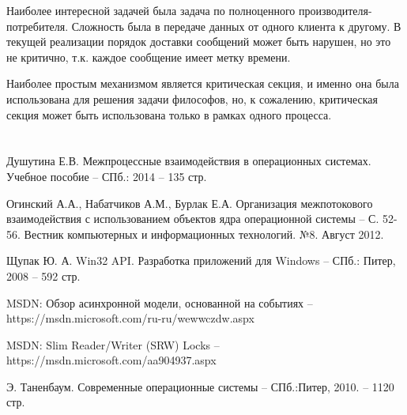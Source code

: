 \documentclass[a4paper, 12pt]{article}		%
\begin{document}
Наиболее интересной задачей была задача по полноценного производителя-потребителя. Сложность была в передаче данных от одного клиента к другому. В текущей реализации порядок доставки сообщений может быть нарушен, но это не критично, т.к. каждое сообщение имеет метку времени.

Наиболее простым механизмом является критическая секция, и именно она была использована для решения задачи философов, но, к сожалению, критическая секция может быть использована только в рамках одного процесса.

\newpage
\section*{}

\begin{thebibliography}{00}

Душутина Е.В. Межпроцессные взаимодействия в операционных системах. Учебное пособие -- СПб.: 2014 -- 135 стр.

Огинский А.А., Набатчиков А.М., Бурлак Е.А. Организация межпотокового взаимодействия с использованием объектов ядра операционной системы -- С. 52-56. Вестник компьютерных и информационных технологий. №8. Август 2012.

Щупак Ю. А. Win32 API. Разработка приложений для Windows -- СПб.: Питер, 2008 -- 592 стр.

MSDN: Обзор асинхронной модели, основанной на событиях -- https://msdn.microsoft.com/ru-ru/wewwczdw.aspx

MSDN: Slim Reader/Writer (SRW) Locks -- https://msdn.microsoft.com/aa904937.aspx

Э. Таненбаум. Современные операционные системы -- СПб.:Питер, 2010. -- 1120 стр.

\end{thebibliography}
\end{document}
